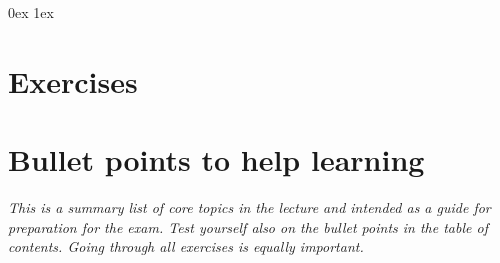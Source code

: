 

\renewcommand{\course}{Introduction to Robotics}
\renewcommand{\coursepicture}{roboticsLecture}
\renewcommand{\coursedate}{Winter 2014}

\script


\clearpage
\slidefont
\fancyhfoffset{0mm}

  \UndefineShortVerb{\@}














  \DefineShortVerb{\@}


\clearpage
\fancyhfoffset{0mm}
\parindent 0ex
\parskip 1ex

\section{Exercises}



















\clearpage

\section{Bullet points to help learning}

\emph{This is a summary list of core topics in the lecture and
  intended as a guide for preparation for the exam. Test yourself also
  on the bullet points in the table of contents. Going through all
  exercises is equally important.}


